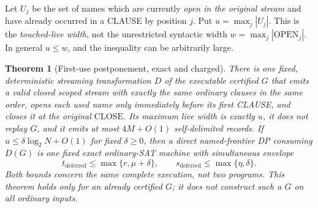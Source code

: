 \documentclass[11pt]{article}
\newtheorem{theorem}{Theorem}
\begin{document}
Let $U_j$ be the set of names which are currently \emph{open in the
original stream} and have already occurred in a CLAUSE by position $j$.
Put $u=\max_j|U_j|$. This is the \emph{touched-live width}, not the
unrestricted syntactic width $w=\max_j|\mathrm{OPEN}_j|$.
In general $u\le w$, and the inequality can be arbitrarily large.

\begin{theorem}[First-use postponement, exact and charged]
There is one fixed, deterministic \emph{streaming} transformation $D$ of
the executable certified $G$ that emits a valid closed scoped stream
with \emph{exactly the same ordinary clauses in the same order},
opens each used name only immediately before its first CLAUSE,
and closes it at the original $\mathrm{CLOSE}$.
Its maximum live width is exactly $u$, it does not replay $G$,
and it emits at most $4M+O(1)$ self-delimited records.
If $u\le\delta\log_2N+O(1)$ for fixed $\delta\ge0$, then
a direct named-frontier DP consuming $D(G)$ is one fixed exact
ordinary-SAT machine with \emph{simultaneous} envelope
\[
\boxed{\quad
t_{\mathrm{deferred}}\le\max\{r,\mu+\delta\},\qquad
s_{\mathrm{deferred}}\le\max\{\eta,\delta\}.
\quad}\tag{1}
\]
Both bounds concern the same complete execution, not two programs.
This theorem holds only for an \emph{already certified} $G$;
it does not construct such a $G$ on all ordinary inputs.
\end{theorem}
\end{document}
